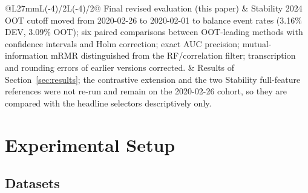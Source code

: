\documentclass[final,5p,twocolumn]{elsarticle}
\begin{document}
\begin{table}[htbp]
\begin{threeparttable}
\begin{tabular}{@{}L{27mm}L{\dimexpr(\textwidth-27mm-4\tabcolsep)/2\relax}L{\dimexpr(\textwidth-27mm-4\tabcolsep)/2\relax}@{}}
\addlinespace
Final revised evaluation (this paper) & Stability 2024 OOT cutoff moved from 2020-02-26 to 2020-02-01 to balance event rates (3.16\% DEV, 3.09\% OOT); six paired comparisons between OOT-leading methods with confidence intervals and Holm correction; exact AUC precision; mutual-information mRMR distinguished from the RF/correlation filter; transcription and rounding errors of earlier versions corrected. & Results of Section~\ref{sec:results}; the contrastive extension and the two Stability full-feature references were not re-run and remain on the 2020-02-26 cohort, so they are compared with the headline selectors descriptively only. \\
\bottomrule
\end{tabular}
\end{threeparttable}
\end{table}


\section{Experimental Setup}
\label{sec:experimental_setup}

\subsection{Datasets}
\label{subsec:datasets}
\end{document}
